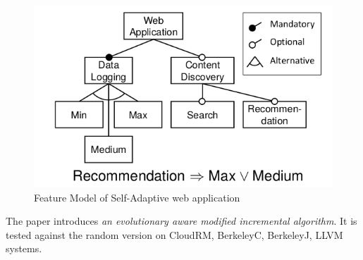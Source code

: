 \documentclass[pdftex,english,oribibl]{llncs}
\begin{document}
\begin{figure}[H]
\centering
	\includegraphics[totalheight=6cm]{figures/featureModel}
    \caption{Feature Model of Self-Adaptive web application \cite{featureModelGuidedLearning}}
    \label{fig:featureModel}
\end{figure}
The paper introduces \textit{an evolutionary aware modified incremental algorithm}.
It is tested against the random version on CloudRM, BerkeleyC, BerkeleyJ, LLVM systems.
\end{document}
